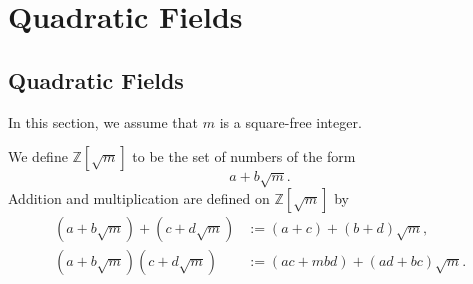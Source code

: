 \chapter{Quadratic Fields}




\section{Quadratic Fields}

In this section, we assume that $m$ is a square-free integer.

\begin{definition}
  We define $\mathbb{Z}[\sqrt{m}]$ to be the set of numbers of the form
  \begin{equation*}
    a+b\sqrt{m}.
  \end{equation*}
  Addition and multiplication are defined on $\mathbb{Z}[\sqrt{m}]$ by
  \begin{align*}
    (a+b\sqrt{m})+(c+d\sqrt{m}) & := (a+c)+(b+d)\sqrt{m}, \\
    (a+b\sqrt{m})(c+d\sqrt{m}) & := (ac + mbd) + (ad + bc)\sqrt{m}.
  \end{align*}
\end{definition}

